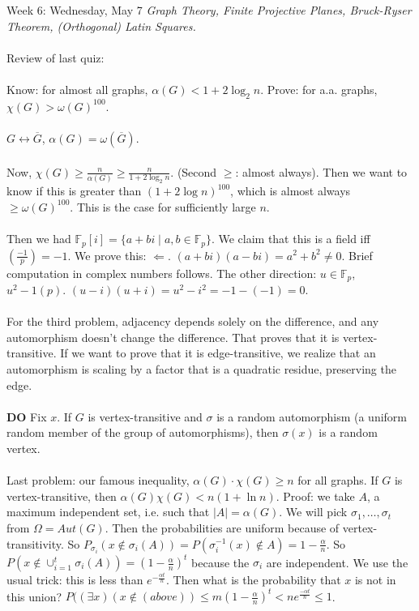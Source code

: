 \documentclass[12pt]{article}
\theoremstyle{remark}
\newcommand{\F}{\mathbb{F}}
\begin{document}
\label{17}\begin{section}{Week 6: Wednesday, May 7}
\indent\textit{Graph Theory, Finite Projective Planes, Bruck-Ryser Theorem, (Orthogonal) Latin Squares.}\\\\
Review of last quiz:
\\\\
Know: for almost all graphs, $\alpha(G) < 1 + 2\log_2 n$. Prove: for a.a. graphs, $\chi(G) > \omega(G)^{100}$. 
\\\\
$G \leftrightarrow \overline{G}$, $\alpha(G) = \omega(\overline{G})$.
\\\\
Now, $\chi(G) \geq \frac{n}{\alpha(G)} \geq \frac{n}{1 + 2\log_2 n}$. (Second $\geq$: almost always). Then we want to know if this is greater than $(1 + 2 \log n)^{100}$, which is almost always $\geq \omega(G)^{100}$. This is the case for sufficiently large $n$.
\\\\
Then we had $\F_p[i] = \{a + bi \mid a,b \in \F_p\}$. We claim that this is a field iff $\left(\frac{-1}{p}\right) = - 1$. We prove this: $\Leftarrow$. $(a+bi)(a-bi)=a^2+b^2 \neq 0$. Brief computation in complex numbers follows. The other direction: $u \in \F_p$, $u^2 -1 (p)$. $(u-i)(u+i) = u^2 - i^2 = -1-(-1)=0$.
\\\\
For the third problem, adjacency depends solely on the difference, and any automorphism doesn't change the difference. That proves that it is vertex-transitive. If we want to prove that it is edge-transitive, we realize that an automorphism is scaling by a factor that is a quadratic residue, preserving the edge.
\\\\
\textbf{DO} Fix $x$. If $G$ is vertex-transitive and $\sigma$ is a random automorphism (a uniform random member of the group of automorphisms), then $\sigma(x)$ is a random vertex.
\\\\
Last problem: our famous inequality, $\alpha(G) \cdot \chi(G) \geq n$ for all graphs. If $G$ is vertex-transitive, then $\alpha(G)\chi(G) < n(1 + \ln n)$. Proof: we take $A$, a 
maximum independent set, i.e. such that $|A| = \alpha(G)$. We will pick $\sigma_1,\ldots,\sigma_t$ from $\Omega = Aut(G)$. 
Then the probabilities are uniform because of vertex-transitivity. So $P_{\sigma_i}(x \notin \sigma_i(A)) = P(\sigma_i^{-1}(x) \notin A) = 1 - \frac{\alpha}{n}$. So $P(x \notin \cup_{i=1}^{t} \sigma_i(A)) = \left(1-\frac{\alpha}{n}\right)^t$ because the $\sigma_i$ are independent. We use the usual trick: this is less than $e^{-\frac{\alpha t}{n}}$. Then what is the probability that $x$ is not in this union? $P((\exists x)(x \notin (above)) \leq m\left(1-\frac{\alpha}{n}\right)^t < ne^{\frac{-\alpha t}{n}} \leq 1$.

\end{section}
\end{document}

